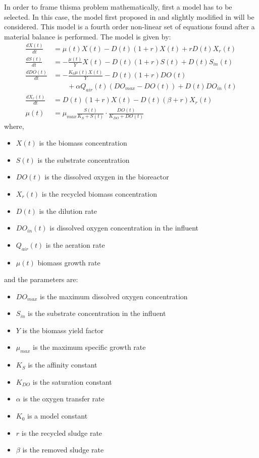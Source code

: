 In order to frame thisma problem mathematically, first a model has to be selected. In this case, the model first proposed in \cite{Nejjari1999} and slightly modified in \cite{Han2008} will be considered. This model is a fourth order non-linear set of equations found after a material balance is performed. The model is given by:
\begin{equation}
	\begin{split}
	\frac{d X (t)}{dt} &= \mu(t) X(t) - D(t) (1+r)X(t)+rD(t)X_r(t)\\
	\frac{d S (t)}{dt} &= -\frac{\mu(t)}{Y}X(t) - D(t)(1+r)S(t)+D(t)S_{in}(t)\\
	\frac{d DO (t)}{dt} &= - \frac{K_0 \mu(t) X(t)}{Y} - D(t)(1+r)DO(t)\\
					& \qquad + \alpha Q_{air}(t) \left(DO_{max} - DO(t)\right) +D(t) DO_{in}(t)\\
	\frac{d X_r (t)}{dt} &= D(t) (1+r) X(t)- D(t) \left( \beta + r \right) X_r(t)\\
	\mu(t) &= \mu_{max} \frac{S(t)}{K_S + S(t)} \cdot \frac{DO(t)}{K_{DO}+DO(t)}
	\end{split}
	\label{frac:WWTPModel}
\end{equation}
%
where,
\begin{itemize}
	\item $X(t)$ is the biomass concentration
	\item $S(t)$ is the substrate concentration
	\item $DO(t)$ is the dissolved oxygen in the bioreactor
	\item $X_r(t)$ is the recycled biomass concentration
	\item $D(t)$ is the dilution rate
	\item $DO_{in}(t)$ is dissolved oxygen concentration in the influent
	\item $Q_{air}(t)$ is the aeration rate
	\item $\mu(t)$ biomass growth rate
\end{itemize}
%
and the parameters are:
\begin{itemize}
	\item $DO_{max}$ is the maximum dissolved oxygen concentration
	\item $S_{in}$ is the substrate concentration in the influent
	\item $Y$ is the biomass yield factor
	\item $\mu_{max}$ is the maximum specific growth rate
	\item $K_S$ is the affinity constant
	\item $K_{DO}$ is the saturation constant
	\item $\alpha$ is the oxygen transfer rate
	\item $K_0$ is a model constant
	\item $r$ is the recycled sludge rate
	\item $\beta$ is the removed sludge rate
\end{itemize}


